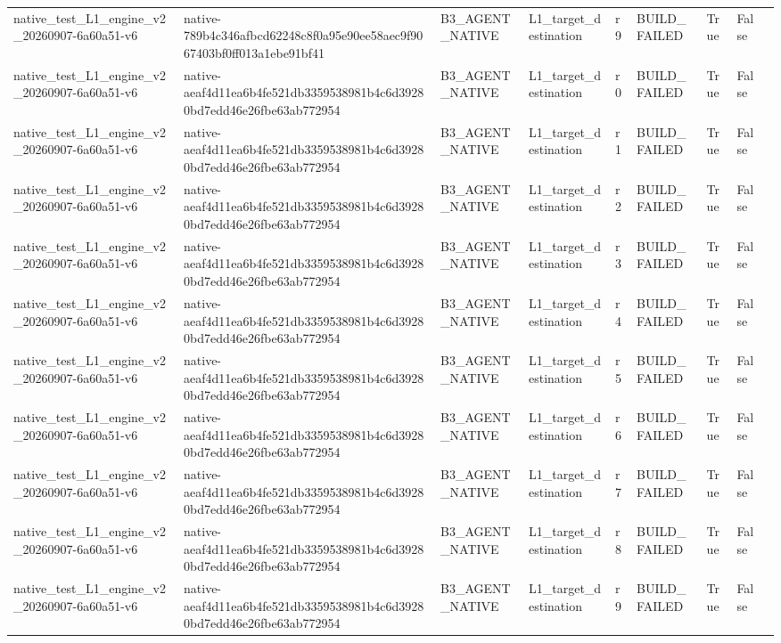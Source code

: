 \begin{tabular}{lllllllll}
native\_test\_L1\_engine\_v2\_20260907-6a60a51-v6 & native-789b4c346afbcd62248c8f0a95e90ee58aec9f9067403bf0ff013a1ebe91bf41 & B3\_AGENT\_NATIVE & L1\_target\_destination & r9 & BUILD\_FAILED & True & False &  \\
native\_test\_L1\_engine\_v2\_20260907-6a60a51-v6 & native-aeaf4d11ea6b4fe521db3359538981b4c6d39280bd7edd46e26fbe63ab772954 & B3\_AGENT\_NATIVE & L1\_target\_destination & r0 & BUILD\_FAILED & True & False &  \\
native\_test\_L1\_engine\_v2\_20260907-6a60a51-v6 & native-aeaf4d11ea6b4fe521db3359538981b4c6d39280bd7edd46e26fbe63ab772954 & B3\_AGENT\_NATIVE & L1\_target\_destination & r1 & BUILD\_FAILED & True & False &  \\
native\_test\_L1\_engine\_v2\_20260907-6a60a51-v6 & native-aeaf4d11ea6b4fe521db3359538981b4c6d39280bd7edd46e26fbe63ab772954 & B3\_AGENT\_NATIVE & L1\_target\_destination & r2 & BUILD\_FAILED & True & False &  \\
native\_test\_L1\_engine\_v2\_20260907-6a60a51-v6 & native-aeaf4d11ea6b4fe521db3359538981b4c6d39280bd7edd46e26fbe63ab772954 & B3\_AGENT\_NATIVE & L1\_target\_destination & r3 & BUILD\_FAILED & True & False &  \\
native\_test\_L1\_engine\_v2\_20260907-6a60a51-v6 & native-aeaf4d11ea6b4fe521db3359538981b4c6d39280bd7edd46e26fbe63ab772954 & B3\_AGENT\_NATIVE & L1\_target\_destination & r4 & BUILD\_FAILED & True & False &  \\
native\_test\_L1\_engine\_v2\_20260907-6a60a51-v6 & native-aeaf4d11ea6b4fe521db3359538981b4c6d39280bd7edd46e26fbe63ab772954 & B3\_AGENT\_NATIVE & L1\_target\_destination & r5 & BUILD\_FAILED & True & False &  \\
native\_test\_L1\_engine\_v2\_20260907-6a60a51-v6 & native-aeaf4d11ea6b4fe521db3359538981b4c6d39280bd7edd46e26fbe63ab772954 & B3\_AGENT\_NATIVE & L1\_target\_destination & r6 & BUILD\_FAILED & True & False &  \\
native\_test\_L1\_engine\_v2\_20260907-6a60a51-v6 & native-aeaf4d11ea6b4fe521db3359538981b4c6d39280bd7edd46e26fbe63ab772954 & B3\_AGENT\_NATIVE & L1\_target\_destination & r7 & BUILD\_FAILED & True & False &  \\
native\_test\_L1\_engine\_v2\_20260907-6a60a51-v6 & native-aeaf4d11ea6b4fe521db3359538981b4c6d39280bd7edd46e26fbe63ab772954 & B3\_AGENT\_NATIVE & L1\_target\_destination & r8 & BUILD\_FAILED & True & False &  \\
native\_test\_L1\_engine\_v2\_20260907-6a60a51-v6 & native-aeaf4d11ea6b4fe521db3359538981b4c6d39280bd7edd46e26fbe63ab772954 & B3\_AGENT\_NATIVE & L1\_target\_destination & r9 & BUILD\_FAILED & True & False &  \\

\end{tabular}
